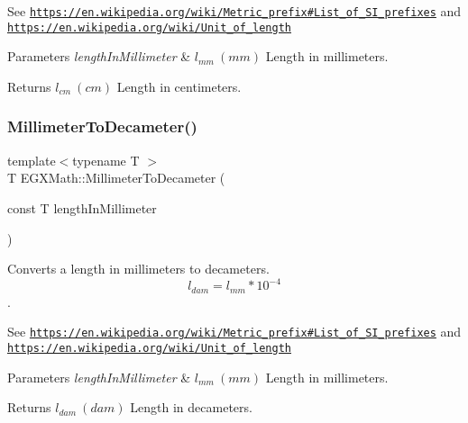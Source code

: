 See \href{https://en.wikipedia.org/wiki/Metric_prefix#List_of_SI_prefixes}{\tt https\+://en.\+wikipedia.\+org/wiki/\+Metric\+\_\+prefix\#\+List\+\_\+of\+\_\+\+S\+I\+\_\+prefixes} and \href{https://en.wikipedia.org/wiki/Unit_of_length}{\tt https\+://en.\+wikipedia.\+org/wiki/\+Unit\+\_\+of\+\_\+length} 
\begin{DoxyParams}{Parameters}
{\em length\+In\+Millimeter} & $ l_{mm}\ (mm)$ Length in millimeters. \\
\hline
\end{DoxyParams}
\begin{DoxyReturn}{Returns}
$ l_{cm}\ (cm)$ Length in centimeters. 
\end{DoxyReturn}
\mbox{\label{group___e_g_x_math-_conversions-_length_conversions-_millimeter-_s_i_gaf0e54830f6ae997dde95341e87638bf5}} 
\subsubsection{\texorpdfstring{Millimeter\+To\+Decameter()}{MillimeterToDecameter()}}
{\footnotesize\ttfamily template$<$typename T $>$ \\
T E\+G\+X\+Math\+::\+Millimeter\+To\+Decameter (\begin{DoxyParamCaption}\item[{const T}]{length\+In\+Millimeter }\end{DoxyParamCaption})}



Converts a length in millimeters to decameters. \[ l_{dam}=l_{mm} * 10^{-4} \]. 

See \href{https://en.wikipedia.org/wiki/Metric_prefix#List_of_SI_prefixes}{\tt https\+://en.\+wikipedia.\+org/wiki/\+Metric\+\_\+prefix\#\+List\+\_\+of\+\_\+\+S\+I\+\_\+prefixes} and \href{https://en.wikipedia.org/wiki/Unit_of_length}{\tt https\+://en.\+wikipedia.\+org/wiki/\+Unit\+\_\+of\+\_\+length} 
\begin{DoxyParams}{Parameters}
{\em length\+In\+Millimeter} & $ l_{mm}\ (mm)$ Length in millimeters. \\
\hline
\end{DoxyParams}
\begin{DoxyReturn}{Returns}
$ l_{dam}\ (dam)$ Length in decameters. 
\end{DoxyReturn}
\mbox{\label{group___e_g_x_math-_conversions-_length_conversions-_millimeter-_s_i_gad38e2be59f56a27e7628cfcbaa4a7df2}} 
